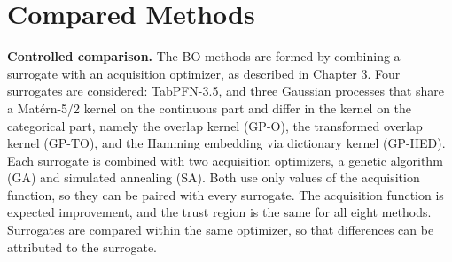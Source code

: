 

\section{Compared Methods}

\textbf{Controlled comparison.} The BO methods are formed by combining a surrogate with an acquisition optimizer, as described in Chapter 3. Four surrogates are considered: TabPFN-3.5, and three Gaussian processes that share a Matérn-5/2 kernel on the continuous part and differ in the kernel on the categorical part, namely the overlap kernel (GP-O), the transformed overlap kernel (GP-TO), and the Hamming embedding via dictionary kernel (GP-HED). Each surrogate is combined with two acquisition optimizers, a genetic algorithm (GA) and simulated annealing (SA). Both use only values of the acquisition function, so they can be paired with every surrogate. The acquisition function is expected improvement, and the trust region is the same for all eight methods. Surrogates are compared within the same optimizer, so that differences can be attributed to the surrogate.

